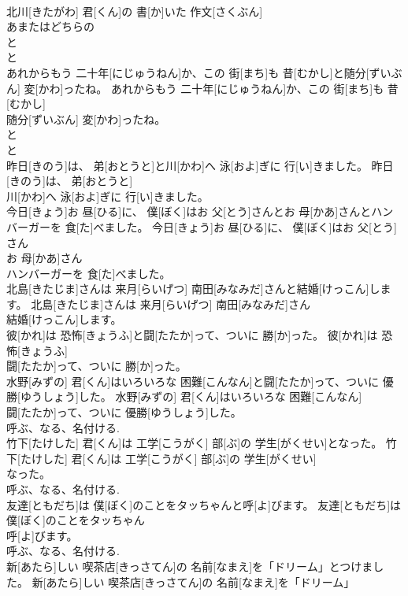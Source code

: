 \documentclass[8pt]{extreport}
\begin{document}
\begin{CJK}{UTF8}{min}
\\	北川[きたがわ] 君[くん]の 書[か]いた 作文[さくぶん]
\\	あまたはどちらの	
\\	と 
\\	と 
\\	あれからもう 二十年[にじゅうねん]か、この 街[まち]も 昔[むかし]と随分[ずいぶん] 変[かわ]ったね。	あれからもう 二十年[にじゅうねん]か、この 街[まち]も 昔[むかし]
\\	随分[ずいぶん] 変[かわ]ったね。	
\\	と 
\\	と 
\\	昨日[きのう]は、 弟[おとうと]と川[かわ]へ 泳[およ]ぎに 行[い]きました。	昨日[きのう]は、 弟[おとうと]
\\	川[かわ]へ 泳[およ]ぎに 行[い]きました。	
\\	今日[きょう]お 昼[ひる]に、 僕[ぼく]はお 父[とう]さんとお 母[かあ]さんとハンバーガーを 食[た]べました。	今日[きょう]お 昼[ひる]に、 僕[ぼく]はお 父[とう]さん
\\	お 母[かあ]さん
\\	ハンバーガーを 食[た]べました。	
\\	北島[きたじま]さんは 来月[らいげつ] 南田[みなみだ]さんと結婚[けっこん]します。	北島[きたじま]さんは 来月[らいげつ] 南田[みなみだ]さん
\\	結婚[けっこん]します。	
\\	彼[かれ]は 恐怖[きょうふ]と闘[たたか]って、ついに 勝[か]った。	彼[かれ]は 恐怖[きょうふ]
\\	闘[たたか]って、ついに 勝[か]った。	
\\	水野[みずの] 君[くん]はいろいろな 困難[こんなん]と闘[たたか]って、ついに 優勝[ゆうしょう]した。	水野[みずの] 君[くん]はいろいろな 困難[こんなん]
\\	闘[たたか]って、ついに 優勝[ゆうしょう]した。	
\\	呼ぶ、なる、名付ける. 
\\	竹下[たけした] 君[くん]は 工学[こうがく] 部[ぶ]の 学生[がくせい]となった。	竹下[たけした] 君[くん]は 工学[こうがく] 部[ぶ]の 学生[がくせい]
\\	なった。	
\\	呼ぶ、なる、名付ける. 
\\	友達[ともだち]は 僕[ぼく]のことをタッちゃんと呼[よ]びます。	友達[ともだち]は 僕[ぼく]のことをタッちゃん
\\	呼[よ]びます。	
\\	呼ぶ、なる、名付ける. 
\\	新[あたら]しい 喫茶店[きっさてん]の 名前[なまえ]を「ドリーム」とつけました。	新[あたら]しい 喫茶店[きっさてん]の 名前[なまえ]を「ドリーム」

\end{CJK}
\end{document}
